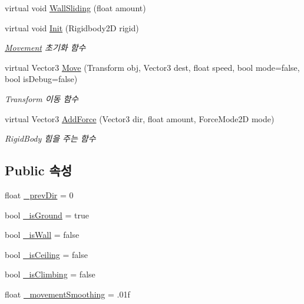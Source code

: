 \begin{DoxyCompactItemize}
virtual void \mbox{\hyperlink{class_player_movement_a9a54ca25bbc57c10ddbd74d4a0b1e30f}{Wall\+Sliding}} (float amount)
\item 
virtual void \mbox{\hyperlink{class_movement_a1c50c07edbe274e1cf55253e87506684}{Init}} (Rigidbody2D rigid)
\begin{DoxyCompactList}\small\item\em \mbox{\hyperlink{class_movement}{Movement}} 초기화 함수 \end{DoxyCompactList}\item 
virtual Vector3 \mbox{\hyperlink{class_movement_ad400f155e0556a5e22a74cb77858460a}{Move}} (Transform obj, Vector3 dest, float speed, bool mode=false, bool is\+Debug=false)
\begin{DoxyCompactList}\small\item\em Transform 이동 함수 \end{DoxyCompactList}\item 
virtual Vector3 \mbox{\hyperlink{class_movement_a132e2f7bc0af811ff3b1ab86c8d1f090}{Add\+Force}} (Vector3 dir, float amount, Force\+Mode2D mode)
\begin{DoxyCompactList}\small\item\em Rigid\+Body 힘을 주는 함수 \end{DoxyCompactList}\end{DoxyCompactItemize}
\subsection*{Public 속성}
\begin{DoxyCompactItemize}
\item 
float \mbox{\hyperlink{class_player_movement_a802b794d028125d4e547a9caeb90d3d4}{\+\_\+prev\+Dir}} = 0
\item 
bool \mbox{\hyperlink{class_player_movement_a3096725f76488ebfdc761c53e9fac852}{\+\_\+is\+Ground}} = true
\item 
bool \mbox{\hyperlink{class_player_movement_a675cef6bf2bfaa54c290f2b73caf91cb}{\+\_\+is\+Wall}} = false
\item 
bool \mbox{\hyperlink{class_player_movement_a3701c47b7350464da003c1cc53f1bf69}{\+\_\+is\+Ceiling}} = false
\item 
bool \mbox{\hyperlink{class_player_movement_af8ea9d72a49e01aecdf8cfd6d2b0b3cf}{\+\_\+is\+Climbing}} = false
\item 
float \mbox{\hyperlink{class_movement_aff7ca49ff5d930ac7345da97a5162e3a}{\+\_\+movement\+Smoothing}} = .\+01f
\end{DoxyCompactItemize}
